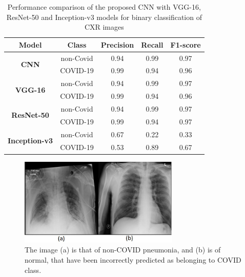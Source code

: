 \documentclass[10pt,journal,compsoc]{IEEEtran}
\begin{document}
\begin{table}
\renewcommand{\arraystretch}{1.3}
\caption{Performance comparison of the proposed CNN with VGG-16, ResNet-50 and Inception-v3 models for binary classification of CXR images}\label{table_8}
\begin{tabular}{|c|c|c|c|c|}
    \hline
    
    \bfseries Model & \bfseries  Class     & \bfseries  Precision    & \bfseries Recall      & \bfseries F1-score    \\
    \hline
    \multirow{2}{*}{\bfseries CNN} & non-Covid      & 0.94        & 0.99          & 0.97     \\ 
    \cline{2-5}
    &    COVID-19     & 0.99        & 0.94          & 0.96                 \\
    
    \hline
    \multirow{2}{*}{\bfseries VGG-16} & non-Covid &  0.94          & 0.99          & 0.97     \\
    \cline{2-5}
    & COVID-19 & 0.99          & 0.94          & 0.96   \\
    \hline
    \multirow{2}{*}{\bfseries ResNet-50} & non-Covid &  0.94          & 0.99          & 0.97     \\
    \cline{2-5}
    & COVID-19 & 0.99          & 0.94          & 0.97   \\
    \hline
    \multirow{2}{*}{\bfseries Inception-v3} & non-Covid &  0.67          & 0.22          & 0.33     \\
    \cline{2-5}
    & COVID-19 & 0.53          & 0.89          & 0.67   \\
    \hline
    \end{tabular} 
     \end{table}

\begin{figure}[!t]
\centering
\includegraphics[width=3.0in]{xray.jpg}
\caption{The image (a) is that of non-COVID pneumonia, and (b) is of normal, that have been incorrectly predicted as belonging to COVID class.}
\label{fig_3}
\end{figure}
\end{document}
